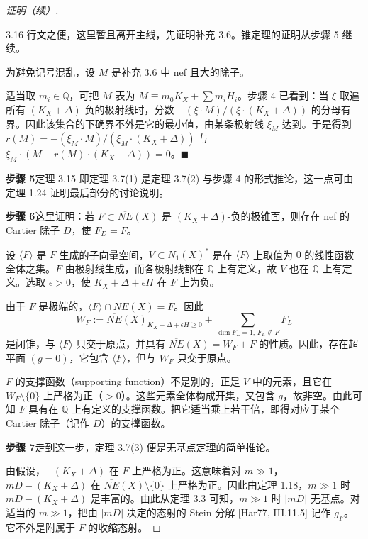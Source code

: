 \begin{proof}[证明（续）]
\begin{remark}{3.16}
行文之便，这里暂且离开主线，先证明补充 3.6。锥定理的证明从步骤 5 继续。

为避免记号混乱，设 $M$ 是补充 3.6 中 nef 且大的除子。

适当取 $m_i\in\mathbb{Q}$，可把 $M$ 表为 $M\equiv m_0K_X+\sum m_iH_i$。步骤 4 已看到：当 $\xi$ 取遍所有 $(K_X+\Delta)$-负的极射线时，分数 $-(\xi\cdot M)/(\xi\cdot(K_X+\Delta))$ 的分母有界。因此该集合的下确界不外是它的最小值，由某条极射线 $\xi_M$ 达到。于是得到 $r(M)=-(\xi_M\cdot M)/(\xi_M\cdot(K_X+\Delta))$ 与 $\xi_M\cdot(M+r(M)\cdot(K_X+\Delta))=0$。\hfill$\blacksquare$
\end{remark}

\par\medskip\noindent\textbf{步骤 5}\quad 定理 3.15 即定理 3.7(1) 是定理 3.7(2) 与步骤 4 的形式推论，这一点可由定理 1.24 证明最后部分的讨论说明。

\par\medskip\noindent\textbf{步骤 6}\quad 这里证明：若 $F\subset\overline{NE}(X)$ 是 $(K_X+\Delta)$-负的极锥面，则存在 nef 的 Cartier 除子 $D$，使 $F_D=F$。

设 $\langle F\rangle$ 是 $F$ 生成的子向量空间，$V\subset N_1(X)^*$ 是在 $\langle F\rangle$ 上取值为 $0$ 的线性函数全体之集。$F$ 由极射线生成，而各极射线都在 $\mathbb{Q}$ 上有定义，故 $V$ 也在 $\mathbb{Q}$ 上有定义。选取 $\epsilon>0$，使 $K_X+\Delta+\epsilon H$ 在 $F$ 上为负。

由于 $F$ 是极端的，$\langle F\rangle\cap\overline{NE}(X)=F$。因此
\[
W_F:=\overline{NE}(X)_{K_X+\Delta+\epsilon H\geq 0}+\sum_{\dim F_L=1,\,F_L\not\subset F}F_L
\]
是闭锥，与 $\langle F\rangle$ 只交于原点，并具有 $\overline{NE}(X)=W_F+F$ 的性质。因此，存在超平面 $(g=0)$，它包含 $\langle F\rangle$，但与 $W_F$ 只交于原点。

$F$ 的支撑函数（supporting function）不是别的，正是 $V$ 中的元素，且它在 $W_F\setminus\{0\}$ 上严格为正（$>0$）。这些元素全体构成开集，又包含 $g$，故非空。由此可知 $F$ 具有在 $\mathbb{Q}$ 上有定义的支撑函数。把它适当乘上若干倍，即得对应于某个 Cartier 除子（记作 $D$）的支撑函数。

\par\medskip\noindent\textbf{步骤 7}\quad 走到这一步，定理 3.7(3) 便是无基点定理的简单推论。

由假设，$-(K_X+\Delta)$ 在 $F$ 上严格为正。这意味着对 $m\gg 1$，$mD-(K_X+\Delta)$ 在 $\overline{NE}(X)\setminus\{0\}$ 上严格为正。因此由定理 1.18，$m\gg 1$ 时 $mD-(K_X+\Delta)$ 是丰富的。由此从定理 3.3 可知，$m\gg 1$ 时 $|mD|$ 无基点。对适当的 $m\gg 1$，把由 $|mD|$ 决定的态射的 Stein 分解 [Har77, III.11.5] 记作 $g_F$。它不外是附属于 $F$ 的收缩态射。


\end{proof}
